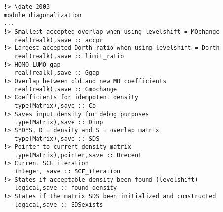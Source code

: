 \documentclass[preprint,aps]{revtex4}
\begin{document}
\begin{itemize}
\begin{verbatim}
!> \date 2003
module diagonalization
...
!> Smallest accepted overlap when using levelshift = MOchange
   real(realk),save :: accpr 
!> Largest accepted Dorth ratio when using levelshift = Dorth
   real(realk),save :: limit_ratio 
!> HOMO-LUMO gap
   real(realk),save :: Ggap 
!> Overlap between old and new MO coefficients
   real(realk),save :: Gmochange
!> Coefficients for idempotent density
   type(Matrix),save :: Co
!> Saves input density for debug purposes
   type(Matrix),save :: Dinp
!> S*D*S, D = density and S = overlap matrix
   type(Matrix),save :: SDS
!> Pointer to current density matrix
   type(Matrix),pointer,save :: Drecent
!> Current SCF iteration
   integer, save :: SCF_iteration
!> States if acceptable density been found (levelshift)
   logical,save :: found_density 
!> States if the matrix SDS been initialized and constructed
   logical,save :: SDSexists


\end{verbatim}
\end{itemize}
\end{document}
